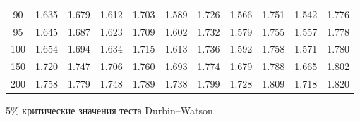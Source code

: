 \documentclass[12pt]{article}
\begin{document}
\begin{table}
\begin{center}
{\begin{tabular}{|c|c|c|c|c|c|c|c|c|c|c|}
	90&1.635&1.679&1.612&1.703&1.589&1.726&1.566&1.751&1.542&1.776\\
	95&1.645&1.687&1.623&1.709&1.602&1.732&1.579&1.755&1.557&1.778\\
	100&1.654&1.694&1.634&1.715&1.613&1.736&1.592&1.758&1.571&1.780\\
	150&1.720&1.747&1.706&1.760&1.693&1.774&1.679&1.788&1.665&1.802\\
	200&1.758&1.779&1.748&1.789&1.738&1.799&1.728&1.809&1.718&1.820\\
	\hline
\end{tabular}
}
\end{center}
\end{table}


\begin{table}
\caption{5\% критические значения теста Durbin--Watson}
\begin{center}



\end{center}
\end{table}
\end{document}

